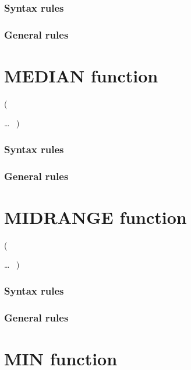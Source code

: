\subsubsection{Syntax rules}

\subsubsection{General rules}

\section{MEDIAN function}

\begin{syntax}
    (
  \begin{1=}
    \argument
  \end{1=}\ldots
  \ {})
\end{syntax}

\subsubsection{Syntax rules}

\subsubsection{General rules}

\section{MIDRANGE function}

\begin{syntax}
    (
  \begin{1=}
    \argument
  \end{1=}\ldots
  \ {})
\end{syntax}

\subsubsection{Syntax rules}

\subsubsection{General rules}

\section{MIN function}

